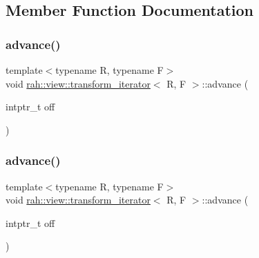 \subsection{Member Function Documentation}
\mbox{\label{structrah_1_1view_1_1transform__iterator_a56c602664659b11bfca3da418c6977be}} 
\subsubsection{\texorpdfstring{advance()}{advance()}\hspace{0.1cm}{\footnotesize\ttfamily [1/2]}}
{\footnotesize\ttfamily template$<$typename R, typename F$>$ \\
void \mbox{\hyperlink{structrah_1_1view_1_1transform__iterator}{rah\+::view\+::transform\+\_\+iterator}}$<$ R, F $>$\+::advance (\begin{DoxyParamCaption}\item[{intptr\+\_\+t}]{off }\end{DoxyParamCaption})\hspace{0.3cm}{\ttfamily [inline]}}

\mbox{\label{structrah_1_1view_1_1transform__iterator_a56c602664659b11bfca3da418c6977be}} 
\subsubsection{\texorpdfstring{advance()}{advance()}\hspace{0.1cm}{\footnotesize\ttfamily [2/2]}}
{\footnotesize\ttfamily template$<$typename R, typename F$>$ \\
void \mbox{\hyperlink{structrah_1_1view_1_1transform__iterator}{rah\+::view\+::transform\+\_\+iterator}}$<$ R, F $>$\+::advance (\begin{DoxyParamCaption}\item[{intptr\+\_\+t}]{off }\end{DoxyParamCaption})\hspace{0.3cm}{\ttfamily [inline]}}

